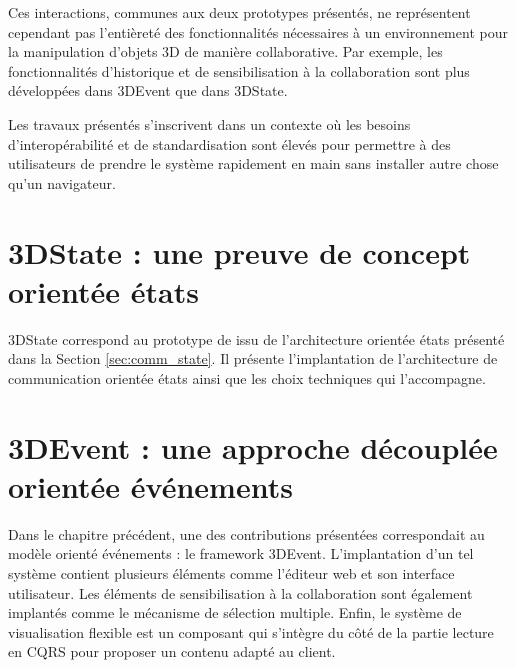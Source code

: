Ces interactions, communes aux deux prototypes présentés, ne 
représentent cependant pas l'entièreté des fonctionnalités nécessaires à un 
environnement pour la manipulation d'objets 3D de manière 
collaborative. Par exemple, les fonctionnalités d'historique et de sensibilisation à 
la collaboration sont plus développées dans 3DEvent que dans 3DState.


Les travaux présentés s'inscrivent dans un contexte où les besoins 
d'interopérabilité et de standardisation sont élevés pour permettre à des 
utilisateurs de prendre le système rapidement en main sans installer autre chose 
qu'un navigateur.
\section{3DState : une preuve de concept orientée états}
\label{sec:3DState}
3DState correspond au prototype de 
issu de l'architecture orientée états présenté dans la Section 
\ref{sec:comm_state}. Il présente l'implantation de l'architecture de 
communication orientée états ainsi que les choix techniques qui l'accompagne.







\section{3DEvent : une approche découplée orientée événements}
\label{sec:3DEvent}
Dans le chapitre précédent, une des contributions présentées correspondait au 
modèle orienté événements : le \gls{framework} 3DEvent. 
L'implantation d'un tel système contient plusieurs éléments comme l'éditeur 
web et son interface utilisateur. Les éléments de sensibilisation à la collaboration 
sont également implantés comme le mécanisme de sélection multiple. Enfin, le 
système de visualisation flexible est un composant qui s'intègre du côté de la 
partie lecture en \gls{CQRS} pour proposer un contenu adapté au client. 






